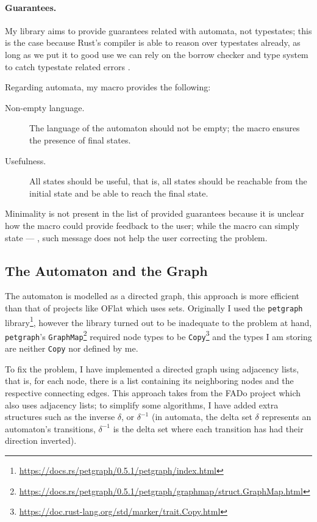 \paragraph{Guarantees.} My library aims to provide guarantees related with automata, not typestates;
this is the case because Rust's compiler is able to reason over typestates already,
as long as we put it to good use we can rely on the borrow checker and type system to catch typestate related errors
.

Regarding automata, my macro provides the following:
\begin{description}
    \item[Non-empty language.] The language of the automaton should not be empty;
    the macro ensures the presence of final states.
    \item[Usefulness.] All states should be useful, that is,
    all states should be reachable from the initial state and be able to reach the final state.
\end{description}

Minimality is not present in the list of provided guarantees because it is unclear how the macro could provide feedback to the user;
while the macro can simply state --- , such message does not help the user correcting the problem.

\subsection{The Automaton and the Graph}\label{sec:validation:automaton}

The automaton is modelled as a directed graph, this approach is more efficient than that of projects like OFlat which uses sets. %
Originally I used the \texttt{petgraph} library\footnote{\url{https://docs.rs/petgraph/0.5.1/petgraph/index.html}},
however the library turned out to be inadequate to the problem at hand,
\texttt{petgraph}'s \texttt{GraphMap}\footnote{\url{https://docs.rs/petgraph/0.5.1/petgraph/graphmap/struct.GraphMap.html}}
required node types to be \texttt{Copy}\footnote{\url{https://doc.rust-lang.org/std/marker/trait.Copy.html}} and
the types I am storing are neither \texttt{Copy} nor defined by me.

To fix the problem, I have implemented a directed graph using adjacency lists, that is, for each node,
there is a list containing its neighboring nodes and the respective connecting edges.
This approach takes from the FADo project which also uses adjacency lists; to simplify some algorithms, %
I have added extra structures such as the inverse $\delta$, or $\delta^{-1}$
(in automata, the delta set $\delta$ represents an automaton's transitions,
$\delta^{-1}$ is the delta set where each transition has had their direction inverted).

